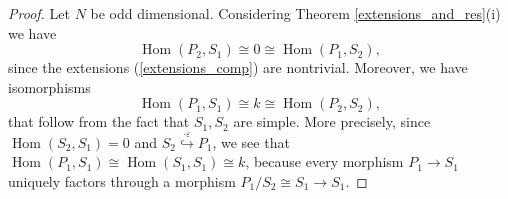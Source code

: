 \documentclass[10pt,a4paper]{amsart}
\DeclareMathOperator{\Hom}{Hom}
\begin{document}
\begin{proof}
    Let $N$ be odd dimensional. Considering Theorem \ref{extensions_and_res}(i) we have 
    \begin{equation*}
        \Hom(P_2, S_1) \cong 0 \cong \Hom(P_1, S_2),
    \end{equation*}
    since the extensions (\ref{extensions_comp}) are nontrivial. Moreover, we have isomorphisms
    \begin{equation*}
         \Hom(P_1, S_1) \cong k \cong \Hom(P_2, S_2),
    \end{equation*}
    that follow from the fact that $S_1, S_2$ are simple. More precisely, since $\Hom(S_2,S_1) =0$ and $S_2 \overset{\cdot \varepsilon}{\hookrightarrow} P_1$, we see that $\Hom(P_1, S_1) \cong \Hom(S_1, S_1) \cong k$, because every morphism $P_1 \to S_1$ uniquely factors through a morphism $P_1/S_2\cong S_1 \to S_1$.
    

\end{proof}
\end{document}
